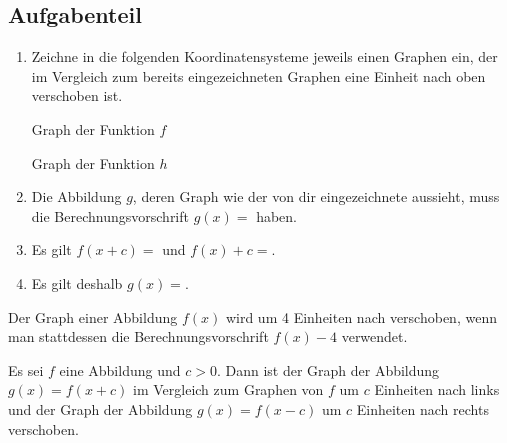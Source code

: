 \documentclass[]{uebungsblatt}
\begin{document}
\subsection*{Aufgabenteil}
\begin{exercise}
    \begin{enumerate}[label = \alph*)]
        \item Zeichne in die folgenden Koordinatensysteme jeweils einen Graphen ein, der im Vergleich zum bereits eingezeichneten Graphen eine Einheit nach oben verschoben ist.
        \begin{multicols}{2}\centering
        
        Graph der Funktion $f$
        

        Graph der Funktion $h$
    \end{multicols}

    
        \item Die Abbildung $g$, deren Graph wie der von dir eingezeichnete aussieht, muss die Berechnungsvorschrift $g(x)=$ haben.
        \item Es gilt $f(x+c)=$ und $f(x)+c=$.
        \item Es gilt deshalb $g(x)=$.
    \end{enumerate}
\end{exercise}
\begin{exercise}
    Der Graph einer Abbildung $f(x)$ wird um 4 Einheiten nach  verschoben, wenn man stattdessen die Berechnungsvorschrift $f(x)-4$ verwendet.
\end{exercise}
\begin{remark}{}
    Es sei $f$ eine Abbildung und $c>0$. Dann ist der Graph der Abbildung $g(x)=f(x+c)$ im Vergleich zum Graphen von $f$ um $c$ Einheiten nach links und der Graph der Abbildung $g(x)=f(x-c)$ um $c$ Einheiten nach rechts verschoben.
\end{remark}
\end{document}
